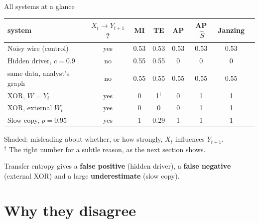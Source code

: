 \documentclass[aspectratio=169,11pt,xcolor={table}]{beamer}
\newcommand{\flagged}[1]{\cellcolor{flag}#1}
\begin{document}
\begin{frame}{All systems at a glance}
  \centering\small
  \renewcommand{\arraystretch}{1.25}
  \begin{tabular}{@{}lccccccc@{}}
    \toprule
    system & $X_t \to Y_{t+1}$? & MI & TE & AP & AP $\mid \hat S$ & Janzing \\
    \midrule
    Noisy wire (control)                 & yes & 0.53 & 0.53 & 0.53 & 0.53 & 0.53 \\
    Hidden driver, $c = 0.9$             & no  & \flagged{0.55} & \flagged{0.55} & 0 & 0 & 0 \\
    \quad same data, analyst's graph     & no  & \flagged{0.55} & \flagged{0.55} & \flagged{0.55} & \flagged{0.55} & \flagged{0.55} \\
    XOR, $W = Y_t$                       & yes & \flagged{0} & 1$^\dagger$ & \flagged{0} & 1 & 1 \\
    XOR, external $W_t$                  & yes & \flagged{0} & \flagged{0} & \flagged{0} & 1 & 1 \\
    Slow copy, $p = 0.95$                & yes & 1 & \flagged{0.29} & 1 & 1 & 1 \\
    \bottomrule
  \end{tabular}
  \par\medskip
  {\color{muted} Shaded: misleading about whether, or how strongly, $X_t$ influences $Y_{t+1}$.\\
  $^\dagger$ The right number for a subtle reason, as the next section shows.}
  \bigskip

  \raggedright
  Transfer entropy gives a \textbf{false positive} (hidden driver), a \textbf{false negative} (external XOR)
  and a large \textbf{underestimate} (slow copy).
\end{frame}

\section{Why they disagree}
\end{document}
